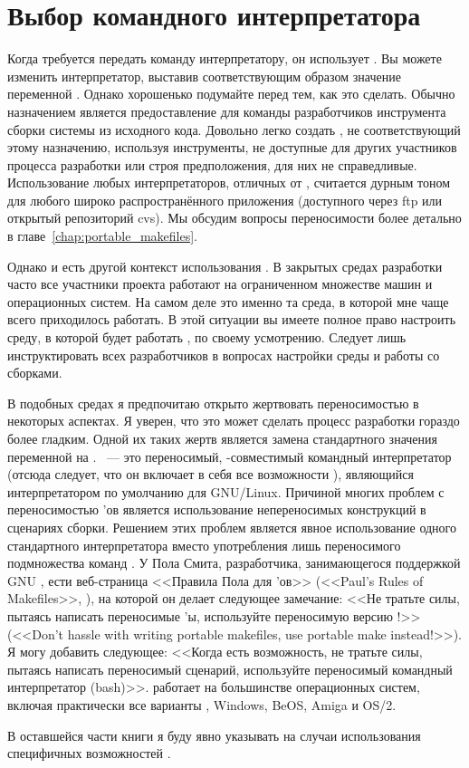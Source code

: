 \section{Выбор командного интерпретатора}
\label{sec:which_shell_to_use}

Когда \GNUmake{} требуется передать команду интерпретатору, он
использует . Вы можете изменить интерпретатор,
выставив соответствующим образом значение переменной .
Однако хорошенько подумайте перед тем, как это сделать. Обычно
назначением \GNUmake{} является предоставление для команды
разработчиков инструмента сборки системы из исходного кода. Довольно
легко создать \Makefile{}, не соответствующий этому назначению,
используя инструменты, не доступные для других участников процесса
разработки или строя предположения, для них не справедливые.
Использование любых интерпретаторов, отличных от ,
считается дурным тоном для любого широко распространённого приложения
(доступного через ftp или открытый репозиторий cvs). Мы обсудим
вопросы переносимости более детально в
главе~\ref{chap:portable_makefiles}.

Однако и есть другой контекст использования \GNUmake{}. В закрытых
средах разработки часто все участники проекта работают на ограниченном
множестве машин и операционных систем. На самом деле это именно та
среда, в которой мне чаще всего приходилось работать. В этой ситуации
вы имеете полное право настроить среду, в которой будет работать
\GNUmake{}, по своему усмотрению. Следует лишь инструктировать всех
разработчиков в вопросах настройки среды и работы со сборками.

В подобных средах я предпочитаю открыто жертвовать переносимостью в
некоторых аспектах. Я уверен, что это может сделать процесс разработки
гораздо более гладким. Одной их таких жертв является замена
стандартного значения переменной  на
. ~--- это переносимый,
\POSIX{}-совместимый командный интерпретатор (отсюда следует, что он
включает в себя все возможности ), являющийся
интерпретатором по умолчанию для GNU/Linux. Причиной многих проблем с
переносимостью \Makefile{}'ов является использование непереносимых
конструкций в сценариях сборки. Решением этих проблем является явное
использование одного стандартного интерпретатора вместо употребления
лишь переносимого подмножества команд . У Пола Смита,
разработчика, занимающегося поддержкой GNU \GNUmake{}, ести
веб-страница <<Правила Пола для \Makefile{}'ов>> (<<Paul's Rules of
Makefiles>>,
), на которой
он делает следующее замечание: <<Не тратьте силы, пытаясь написать
переносимые \Makefile{}'ы, используйте переносимую версию
\GNUmake{}!>> (<<Don't hassle with writing portable makefiles, use
portable make instead!>>). Я могу добавить следующее: <<Когда есть
возможность, не тратьте силы, пытаясь написать переносимый сценарий,
используйте переносимый командный интерпретатор (bash)>>.
 работает на большинстве операционных систем, включая
практически все варианты \UNIX{}, Windows, BeOS, Amiga и OS/2.

В оставшейся части книги я буду явно указывать на случаи использования
специфичных возможностей .
